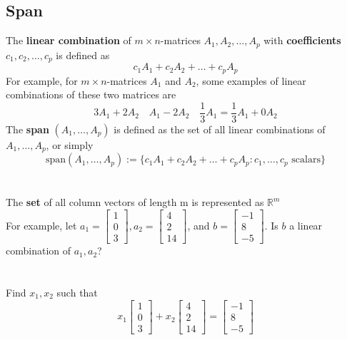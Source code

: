 \subsection{Span}
The \textbf{linear combination} of $m \times n$-matrices $A_1, A_2, \dots, A_p$
with \textbf{coefficients} $c_1, c_2, \dots, c_p$ is defined as
\[
  c_1A_1 + c_2A_2 + \dots + c_pA_p
\] 
For example, for $m \times n$-matrices $A_1$ and $A_2$, some examples of linear combinations of these two matrices are
\[
  3A_1 + 2A_2 \quad A_1 - 2A_2 \quad \frac{1}{3}A_1 = \frac{1}{3}A_1 + 0A_2
\]
The \textbf{span} $(A_1, \dots, A_p)$ is defined as the set of all 
linear combinations of $A_1, \dots, A_p$, or simply
\[
  \text{span}(A_1,\dots,A_p) := \{c_1A_1 + c_2A_2 + \dots + c_pA_p : 
  c_1, \dots, c_p \text{ scalars} \}
\] \\\\ 
The \textbf{set} of all column vectors of length m is represented
as $\mathbb{R}^m$ \\
For example, let $a_1 = \begin{bmatrix}
  1 \\ 0 \\ 3
\end{bmatrix}, a_2 = \begin{bmatrix}
  4 \\ 2 \\ 14
\end{bmatrix}$, and $b = \begin{bmatrix}
  -1 \\ 8 \\ -5
\end{bmatrix}$. Is $b$ a linear combination of $a_1, a_2$? \\\\\\
Find $x_1, x_2$ such that
\[
  x_1\begin{bmatrix}
    1 \\ 0 \\ 3
  \end{bmatrix} + x_2\begin{bmatrix}
    4 \\ 2 \\ 14
  \end{bmatrix} = \begin{bmatrix}
    -1 \\ 8 \\ -5
  \end{bmatrix}
\] \\
